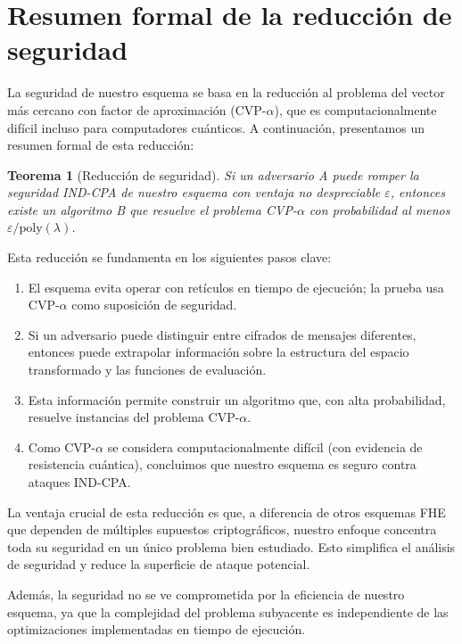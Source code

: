\documentclass[11pt]{article}
\theoremstyle{plain}
\newtheorem{theorem}{Teorema}
\begin{document}
\section{Resumen formal de la reducción de seguridad}

La seguridad de nuestro esquema se basa en la reducción al problema del vector más cercano con factor de aproximación (CVP-$\alpha$), que es computacionalmente difícil incluso para computadores cuánticos. A continuación, presentamos un resumen formal de esta reducción:

\begin{theorem}[Reducción de seguridad]
Si un adversario A puede romper la seguridad IND-CPA de nuestro esquema con ventaja no despreciable $\varepsilon$, entonces existe un algoritmo B que resuelve el problema CVP-$\alpha$ con probabilidad al menos $\varepsilon/\text{poly}(\lambda)$.
\end{theorem}

Esta reducción se fundamenta en los siguientes pasos clave:

\begin{enumerate}
    \item El esquema evita operar con retículos en tiempo de ejecución; la prueba usa CVP-$\alpha$ como suposición de seguridad.
    
    \item Si un adversario puede distinguir entre cifrados de mensajes diferentes, entonces puede extrapolar información sobre la estructura del espacio transformado y las funciones de evaluación.
    
    \item Esta información permite construir un algoritmo que, con alta probabilidad, resuelve instancias del problema CVP-$\alpha$.
    
    \item Como CVP-$\alpha$ se considera computacionalmente difícil (con evidencia de resistencia cuántica), concluimos que nuestro esquema es seguro contra ataques IND-CPA.
\end{enumerate}

La ventaja crucial de esta reducción es que, a diferencia de otros esquemas FHE que dependen de múltiples supuestos criptográficos, nuestro enfoque concentra toda su seguridad en un único problema bien estudiado. Esto simplifica el análisis de seguridad y reduce la superficie de ataque potencial.

Además, la seguridad no se ve comprometida por la eficiencia de nuestro esquema, ya que la complejidad del problema subyacente es independiente de las optimizaciones implementadas en tiempo de ejecución.
\end{document}
